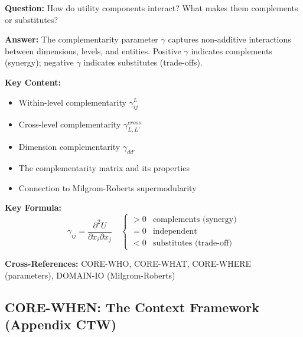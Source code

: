 \begin{tcolorbox}[colback=gray!5!white, colframe=gray!75!black]
\textbf{Question:} How do utility components interact? What makes them complements or substitutes?

\textbf{Answer:} The complementarity parameter $\gamma$ captures non-additive 
interactions between dimensions, levels, and entities. Positive $\gamma$ indicates 
complements (synergy); negative $\gamma$ indicates substitutes (trade-offs).

\textbf{Key Content:}
\begin{itemize}[nosep]
\item Within-level complementarity $\gamma^L_{ij}$
\item Cross-level complementarity $\gamma^{cross}_{L,L'}$
\item Dimension complementarity $\gamma_{dd'}$
\item The complementarity matrix and its properties
\item Connection to Milgrom-Roberts supermodularity
\end{itemize}

\textbf{Key Formula:}
\begin{equation}
\gamma_{ij} = \frac{\partial^2 U}{\partial x_i \partial x_j} \quad
\begin{cases}
> 0 & \text{complements (synergy)} \\
= 0 & \text{independent} \\
< 0 & \text{substitutes (trade-off)}
\end{cases}
\end{equation}

\textbf{Cross-References:} CORE-WHO, CORE-WHAT, CORE-WHERE (parameters), DOMAIN-IO (Milgrom-Roberts)
\end{tcolorbox}

\subsection{CORE-WHEN: The Context Framework (Appendix CTW)}

